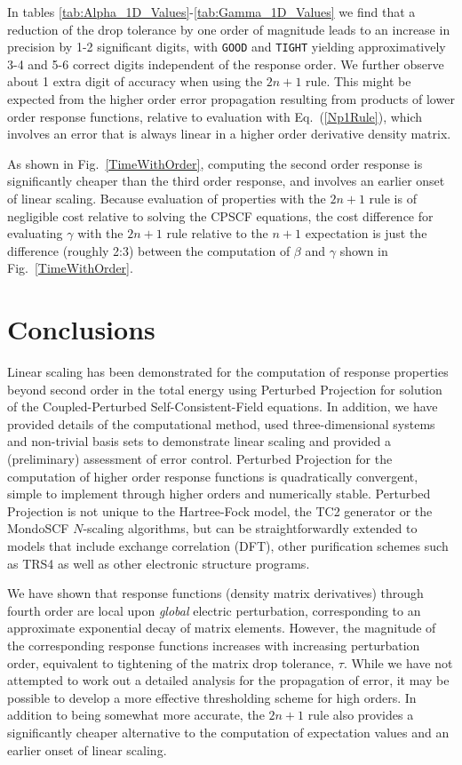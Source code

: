 \documentclass[prl,twocolumn,showpacs,twocolumngrid,superbib]{revtex4}
\begin{document}
In tables \ref{tab:Alpha_1D_Values}-\ref{tab:Gamma_1D_Values} we find that 
a reduction of the drop tolerance by one order of magnitude leads to an increase in precision by
1-2 significant digits, with {\tt GOOD} and {\tt TIGHT} yielding approximatively 3-4 and 5-6 
correct digits  independent of the response order.  We further observe about 1 extra digit of accuracy 
when using the $2n+1$ rule.  This might be expected from the higher order error propagation resulting from 
products of lower order response functions, relative to evaluation with  Eq.~(\ref{Np1Rule}), 
which involves an error that is always linear in a higher order derivative density matrix.  

As shown in Fig.~\ref{TimeWithOrder}, computing the second order response is significantly cheaper 
than the third order response, and involves an earlier onset of linear scaling. Because evaluation 
of properties with the $2 n+1$ rule is of negligible cost relative to solving the CPSCF equations, the cost 
difference for evaluating $\gamma$ with the $2 n+1$ rule relative to the $n+1$ expectation is just the 
difference (roughly 2:3) between the computation of $\beta$ and $\gamma$ shown in Fig.~\ref{TimeWithOrder}.

\section{Conclusions}

Linear scaling has been demonstrated for the computation of response properties beyond second
order in the total energy using Perturbed Projection for solution of the 
Coupled-Perturbed Self-Consistent-Field equations.
In addition, we have provided details of 
the computational method, used three-dimensional systems and non-trivial basis sets
to demonstrate linear scaling and provided a (preliminary) assessment of 
error control.  Perturbed Projection for the 
computation of higher order response functions is quadratically convergent, simple 
to implement through higher orders and numerically stable.  Perturbed Projection is 
not unique to the Hartree-Fock model, the TC2 generator or the {\sc MondoSCF} 
$N$-scaling algorithms, but can be straightforwardly extended to models that include 
exchange correlation (DFT), other purification schemes such as TRS4 \cite{ANiklasson03}
as well as other electronic structure programs.  

We have shown that response functions (density matrix derivatives) through fourth 
order are local upon {\em global} electric perturbation, corresponding to an 
approximate exponential decay of matrix elements.  However, the magnitude of the 
corresponding response functions increases with increasing perturbation order, equivalent 
to tightening of the matrix drop tolerance, $\tau$.   While we have not attempted to 
work out a detailed analysis for the propagation of error, it may be possible 
to develop a more effective thresholding scheme for high orders. In addition 
to being somewhat more accurate, the $2 n+1$ rule also provides a significantly 
cheaper alternative to the computation of expectation values and an earlier onset 
of linear scaling. 
\end{document}
